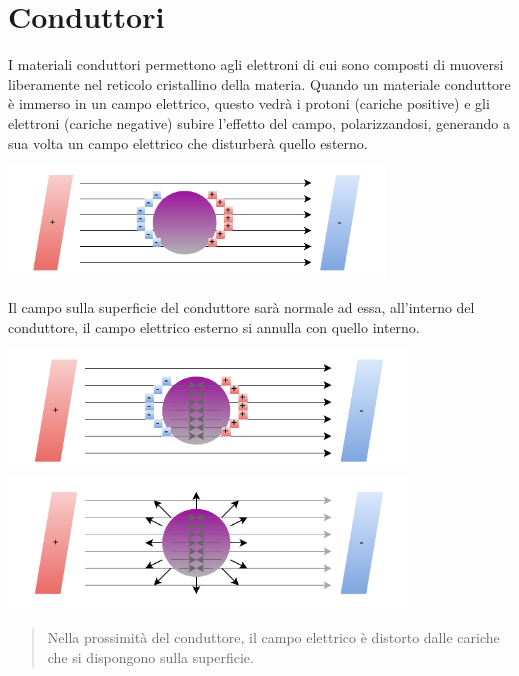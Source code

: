 \documentclass[10pt, letterpaper]{report}
\begin{document}
\section{Conduttori}
I materiali conduttori permettono agli elettroni di cui sono composti di muoversi liberamente nel reticolo cristallino della materia. Quando un materiale conduttore è immerso in un campo elettrico, questo vedrà i protoni (cariche positive) e gli elettroni (cariche negative) subire l'effetto del campo, polarizzandosi, generando a sua volta un campo elettrico che disturberà quello esterno.\begin{center}
    \includegraphics[width=0.75\textwidth]{images/conduttore.pdf}
\end{center}
Il campo sulla superficie del conduttore sarà normale ad essa, all'interno del conduttore, il campo elettrico esterno si annulla con quello interno.\begin{center}
\includegraphics[width=0.8\textwidth]{images/conduttore2.pdf}
\includegraphics[width=0.8\textwidth]{images/conduttore3.pdf}
\end{center}
\begin{quote}
    Nella prossimità del conduttore, il campo elettrico è distorto dalle cariche che si dispongono sulla superficie.
\end{quote}
\end{document}
